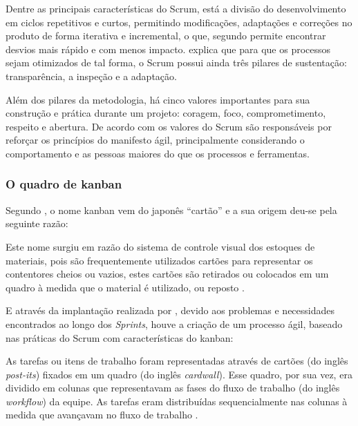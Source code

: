 Dentre as principais características do Scrum, está a divisão do desenvolvimento em ciclos repetitivos e curtos, permitindo modificações, adaptações e correções no produto de forma iterativa e incremental, o que, segundo  permite encontrar desvios mais rápido e com menos impacto.  explica que para que os processos sejam otimizados de tal forma, o Scrum possui ainda três pilares de sustentação: transparência, a inspeção e a adaptação.

Além dos pilares da metodologia, há cinco valores importantes para sua construção e prática durante um projeto: coragem, foco, comprometimento, respeito e abertura.  De acordo com  os valores do Scrum são responsáveis por reforçar os princípios do manifesto ágil, principalmente considerando o comportamento e as pessoas maiores do que os processos e ferramentas. 

\subsubsection{O quadro de kanban}
Segundo , o nome kanban vem do japonês ``cartão'' e a sua origem deu-se pela seguinte razão:

\begin{citacao}
Este nome surgiu em razão do sistema de controle visual dos estoques de materiais, pois são frequentemente utilizados cartões para representar os contentores cheios ou vazios, estes cartões são retirados ou colocados em um quadro à medida que o material é utilizado, ou reposto
\cite{peinado2007compreendendo}.
\end{citacao}

E através da implantação realizada por , devido aos problemas e necessidades encontrados ao longo dos \textsl{Sprints}, houve a criação de um processo ágil, baseado nas práticas do Scrum com características do kanban:

\begin{citacao}
As tarefas ou itens de trabalho foram representadas através de cartões (do inglês \textsl{post-its}) fixados em um quadro (do inglês \textsl{cardwall}). 
Esse quadro, por sua vez, era dividido em colunas que representavam as fases do fluxo de trabalho (do inglês \textsl{workflow}) da equipe. 
As tarefas eram distribuídas sequencialmente nas colunas à medida que avançavam no fluxo de trabalho \cite{silva2012beneficios}.
\end{citacao}

